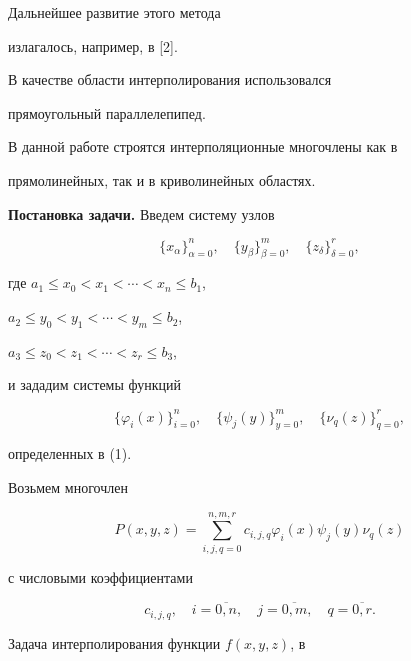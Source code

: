 Дальнейшее развитие этого метода


излагалось, например, в [2].


В качестве области интерполирования использовался


прямоугольный параллелепипед.


В данной работе строятся интерполяционные многочлены как в


прямолинейных, так и в криволинейных областях.





{\bf Постановка задачи.} Введем систему узлов


\begin{equation}


\{x_\alpha\}^n_{\alpha=0},\quad \{y_\beta\}^m_{\beta=0},\quad


\{z_\delta\}^r_{\delta=0},


\end{equation}


где $a_1\le x_0<x_1<\dotsb <x_n\le b_1$,


$a_2\le y_0<y_1<\dotsb <y_m\le b_2$,


$a_3\le z_0<z_1<\dotsb <z_r\le b_3$,\linebreak


и зададим системы функций


\begin{equation}


\{\varphi_i(x)\}^n_{i=0},\quad \{\psi_j(y)\}^m_{y=0},\quad


\{\nu_q(z)\}^r_{q=0},


\end{equation}


определенных в (1).





Возьмем многочлен


$$


P(x,y,z)=\sum_{i,j,q=0}^{n,m,r}c_{i,j,q}\varphi_i(x) \psi_j(y)\nu_q(z)


$$


с числовыми коэффициентами


\begin{equation}


c_{i,j,q},\quad i=\overline{0,n},\quad j=\overline{0,m},\quad


q=\overline{0,r}.


\end{equation}


Задача интерполирования функции $f(x,y,z)$, в


